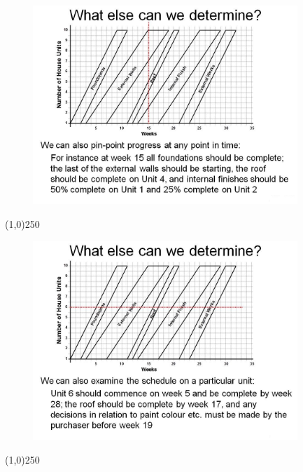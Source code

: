 \begin{frame}
\begin{figure}
	\centering
		\includegraphics[width = 10.0cm]{oldnotes/Slide268.jpg}
\end{figure}
\end{frame}
\begin{center}\line(1,0){250}\end{center}






\begin{frame}
\begin{figure}
	\centering
		\includegraphics[width = 10.0cm]{oldnotes/Slide269.jpg}
\end{figure}
\end{frame}
\begin{center}\line(1,0){250}\end{center}






